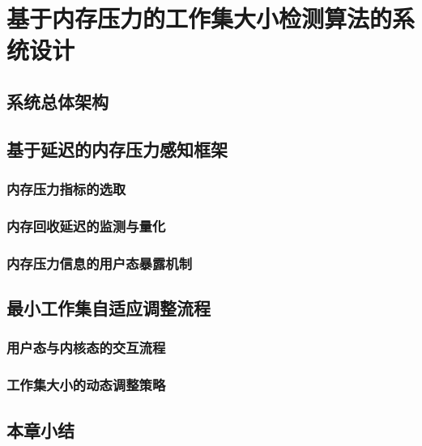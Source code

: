 
\chapter{基于内存压力的工作集大小检测算法的系统设计}

\section{系统总体架构}


\section{基于延迟的内存压力感知框架}

\subsection{内存压力指标的选取}

\subsection{内存回收延迟的监测与量化}

\subsection{内存压力信息的用户态暴露机制}

\section{最小工作集自适应调整流程}

\subsection{用户态与内核态的交互流程}

\subsection{工作集大小的动态调整策略}

\section{本章小结}
